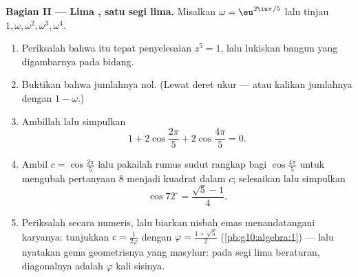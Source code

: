 \begin{problem}
\medskip
\noindent\textbf{Bagian II --- Lima , satu segi lima.}
Misalkan $\omega = \eu^{2\iu\pi/5}$ lalu tinjau
$1, \omega, \omega^2, \omega^3, \omega^4$.
\begin{enumerate}[resume]
  \item Periksalah bahwa itu tepat penyelesaian $z^5 = 1$,
        lalu lukiskan bangun yang digambarnya pada bidang.
  \item Buktikan bahwa jumlahnya nol. (Lewat deret ukur
        --- atau kalikan jumlahnya dengan $1 - \omega$.)
  \item Ambillah  lalu simpulkan
        \[
        1 + 2\cos\frac{2\pi}{5} + 2\cos\frac{4\pi}{5} = 0 .
        \]
  \item Ambil $c = \cos\frac{2\pi}{5}$ lalu pakailah rumus sudut
        rangkap bagi $\cos\frac{4\pi}{5}$ untuk mengubah pertanyaan 8
        menjadi  kuadrat dalam $c$; selesaikan lalu
        simpulkan
        \[
        \cos 72^\circ = \frac{\sqrt5 - 1}{4} .
        \]
  \item Periksalah secara numeris, lalu biarkan nisbah emas menandatangani
        karyanya: tunjukkan $c = \frac{1}{2\varphi}$ dengan
        $\varphi = \frac{1 + \sqrt5}{2}$
        (\cref{pb:g10:algebra:1}) --- lalu nyatakan gema
        geometrisnya yang masyhur: pada segi lima beraturan, diagonalnya
        adalah $\varphi$ kali sisinya.
\end{enumerate}


\end{problem}
